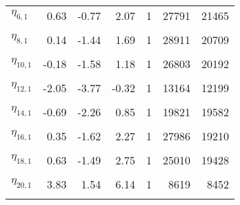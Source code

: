 \begin{table}
\begin{tabular}[t]{lrrrrrr}
$\eta_{6,  1}$ & 0.63 & -0.77 & 2.07 & 1 & 27791 & 21465\\
\cellcolor{gray!6}{$\eta_{7,  1}$} & \cellcolor{gray!6}{2.44} & \cellcolor{gray!6}{0.06} & \cellcolor{gray!6}{5.14} & \cellcolor{gray!6}{1} & \cellcolor{gray!6}{11960} & \cellcolor{gray!6}{16274}\\
$\eta_{8,  1}$ & 0.14 & -1.44 & 1.69 & 1 & 28911 & 20709\\
\cellcolor{gray!6}{$\eta_{9,  1}$} & \cellcolor{gray!6}{-0.14} & \cellcolor{gray!6}{-2.74} & \cellcolor{gray!6}{2.28} & \cellcolor{gray!6}{1} & \cellcolor{gray!6}{26992} & \cellcolor{gray!6}{18502}\\
$\eta_{10,  1}$ & -0.18 & -1.58 & 1.18 & 1 & 26803 & 20192\\
\cellcolor{gray!6}{$\eta_{11,  1}$} & \cellcolor{gray!6}{-0.86} & \cellcolor{gray!6}{-2.22} & \cellcolor{gray!6}{0.50} & \cellcolor{gray!6}{1} & \cellcolor{gray!6}{22292} & \cellcolor{gray!6}{20113}\\
$\eta_{12,  1}$ & -2.05 & -3.77 & -0.32 & 1 & 13164 & 12199\\
\cellcolor{gray!6}{$\eta_{13,  1}$} & \cellcolor{gray!6}{1.11} & \cellcolor{gray!6}{-0.30} & \cellcolor{gray!6}{2.57} & \cellcolor{gray!6}{1} & \cellcolor{gray!6}{24740} & \cellcolor{gray!6}{19483}\\
$\eta_{14,  1}$ & -0.69 & -2.26 & 0.85 & 1 & 19821 & 19582\\
\cellcolor{gray!6}{$\eta_{15,  1}$} & \cellcolor{gray!6}{0.33} & \cellcolor{gray!6}{-1.95} & \cellcolor{gray!6}{2.53} & \cellcolor{gray!6}{1} & \cellcolor{gray!6}{26349} & \cellcolor{gray!6}{19536}\\
$\eta_{16,  1}$ & 0.35 & -1.62 & 2.27 & 1 & 27986 & 19210\\
\cellcolor{gray!6}{$\eta_{17,  1}$} & \cellcolor{gray!6}{1.23} & \cellcolor{gray!6}{-0.42} & \cellcolor{gray!6}{2.94} & \cellcolor{gray!6}{1} & \cellcolor{gray!6}{28949} & \cellcolor{gray!6}{19136}\\
$\eta_{18,  1}$ & 0.63 & -1.49 & 2.75 & 1 & 25010 & 19428\\
\cellcolor{gray!6}{$\eta_{19,  1}$} & \cellcolor{gray!6}{1.74} & \cellcolor{gray!6}{0.11} & \cellcolor{gray!6}{3.42} & \cellcolor{gray!6}{1} & \cellcolor{gray!6}{18872} & \cellcolor{gray!6}{19508}\\
$\eta_{20,  1}$ & 3.83 & 1.54 & 6.14 & 1 & 8619 & 8452\\
\cellcolor{gray!6}{$\eta_{21,  1}$} & \cellcolor{gray!6}{-0.04} & \cellcolor{gray!6}{-2.05} & \cellcolor{gray!6}{1.90} & \cellcolor{gray!6}{1} & \cellcolor{gray!6}{25837} & \cellcolor{gray!6}{18119}\\

\end{tabular}
\end{table}
